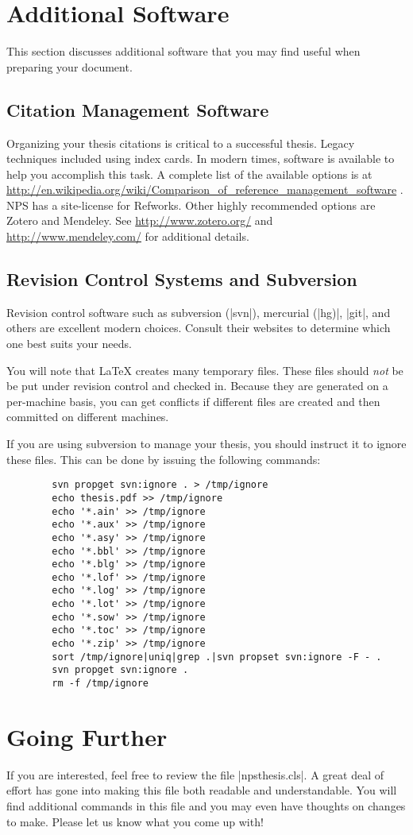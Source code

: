 \section{Additional Software}
This section discusses additional software that you may find useful
when preparing your document.
\subsection{Citation Management Software}
Organizing your thesis citations is critical to a successful thesis.  Legacy techniques included using index cards.
In modern times, software is available to help you accomplish this task.  A complete list of the available options is
at \url{http://en.wikipedia.org/wiki/Comparison_of_reference_management_software} .  NPS has a site-license for Refworks.
Other highly recommended options are Zotero and Mendeley.  See \url{http://www.zotero.org/} and \url{http://www.mendeley.com/}
for additional details.
   
\subsection{Revision Control Systems and Subversion}
Revision control software such as subversion (|svn|), mercurial (|hg)|, |git|, and others are excellent modern choices.  
Consult their websites to determine which one best suits your needs.

You will note that \LaTeX{} creates many temporary files. These files should \emph{not} be
be put under revision control and checked in. Because they are generated on a
per-machine basis, you can get conflicts if different files are
created and then committed on different machines.

If you are using subversion to manage your thesis, you should instruct it to ignore these files.  This
can be done by issuing the following commands:

\begin{Verbatim}
        svn propget svn:ignore . > /tmp/ignore
        echo thesis.pdf >> /tmp/ignore
        echo '*.ain' >> /tmp/ignore
        echo '*.aux' >> /tmp/ignore
        echo '*.asy' >> /tmp/ignore
        echo '*.bbl' >> /tmp/ignore
        echo '*.blg' >> /tmp/ignore
        echo '*.lof' >> /tmp/ignore
        echo '*.log' >> /tmp/ignore
        echo '*.lot' >> /tmp/ignore
        echo '*.sow' >> /tmp/ignore
        echo '*.toc' >> /tmp/ignore
        echo '*.zip' >> /tmp/ignore
        sort /tmp/ignore|uniq|grep .|svn propset svn:ignore -F - .
        svn propget svn:ignore .
        rm -f /tmp/ignore
\end{Verbatim}



\section{Going Further}
If you are interested, feel free to review the file
|npsthesis.cls|. A great deal of effort has gone into making this
file both readable and understandable. You will find additional
commands in this file and you may even have thoughts on changes to
make. Please let us know what you come up with!


